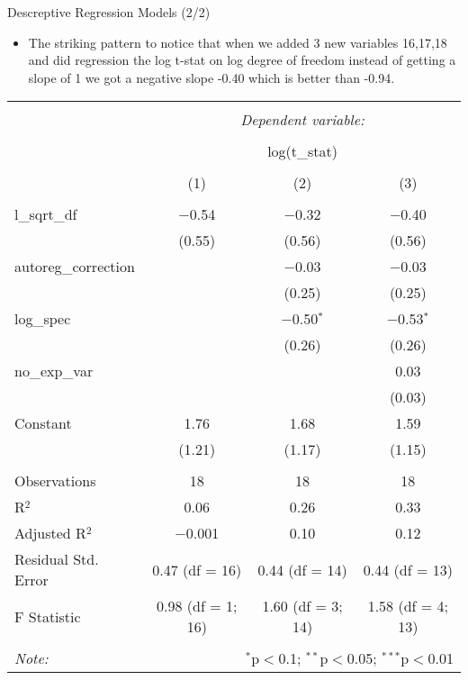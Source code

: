 \documentclass[
  9 pt,
  ignorenonframetext,
]{beamer}
\providecommand{\tightlist}{%
  \setlength{\itemsep}{0pt}\setlength{\parskip}{0pt}}
\begin{document}
\begin{frame}{Descreptive Regression Models (2/2)}
\protect\hypertarget{descreptive-regression-models-22}{}
\begin{itemize}
\tightlist
\item
  The striking pattern to notice that when we added 3 new variables
  16,17,18 and did regression the log t-stat on log degree of freedom
  instead of getting a slope of 1 we got a negative slope -0.40 which is
  better than -0.94.
\end{itemize}

\begin{table}[!htbp] \centering 

  \label{} 
\footnotesize 
\begin{tabular}{@{\extracolsep{5pt}}lccc} 
\\[-1.8ex]\hline 
\hline \\[-1.8ex] 
 & \multicolumn{3}{c}{\textit{Dependent variable:}} \\ 
\cline{2-4} 
\\[-1.8ex] & \multicolumn{3}{c}{log(t\_stat)} \\ 
\\[-1.8ex] & (1) & (2) & (3)\\ 
\hline \\[-1.8ex] 
 l\_sqrt\_df & $-$0.54 & $-$0.32 & $-$0.40 \\ 
  & (0.55) & (0.56) & (0.56) \\ 
  autoreg\_correction &  & $-$0.03 & $-$0.03 \\ 
  &  & (0.25) & (0.25) \\ 
  log\_spec &  & $-$0.50$^{*}$ & $-$0.53$^{*}$ \\ 
  &  & (0.26) & (0.26) \\ 
  no\_exp\_var &  &  & 0.03 \\ 
  &  &  & (0.03) \\ 
  Constant & 1.76 & 1.68 & 1.59 \\ 
  & (1.21) & (1.17) & (1.15) \\ 
 \hline \\[-1.8ex] 
Observations & 18 & 18 & 18 \\ 
R$^{2}$ & 0.06 & 0.26 & 0.33 \\ 
Adjusted R$^{2}$ & $-$0.001 & 0.10 & 0.12 \\ 
Residual Std. Error & 0.47 (df = 16) & 0.44 (df = 14) & 0.44 (df = 13) \\ 
F Statistic & 0.98 (df = 1; 16) & 1.60 (df = 3; 14) & 1.58 (df = 4; 13) \\ 
\hline 
\hline \\[-1.8ex] 
\textit{Note:}  & \multicolumn{3}{r}{$^{*}$p$<$0.1; $^{**}$p$<$0.05; $^{***}$p$<$0.01} \\ 
\end{tabular} 
\end{table}
\end{frame}
\end{document}
